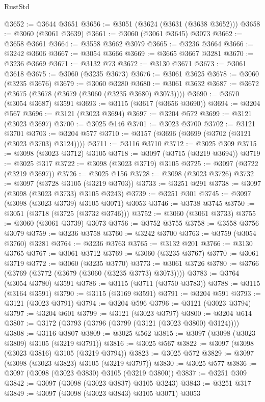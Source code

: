 \begin{lexlean}{RustStd}
\begin{coremodule}
{\begin{coremodule}
{{{{{{{{{{{{{{{{{{{{{{{{{{{{{{{{@3652 := @3644 @3651
@3656 := @3051 (@3624 (@3631 (@3638 @3652)))
@3658 := @3060 (@3061 @3639)
@3661 := @3060 (@3061 @3645) @3073
@3662 := @3658 @3661
@3664 := @3558 @3662 @3079
@3665 := @3236 @3664
@3666 := @3242 @3606
@3667 := @3054 @3666
@3669 := @3665 @3667 @3281
@3670 := @3236 @3669
@3671 := @3132 @73
@3672 := @3130 @3671
@3673 := @3061 @3618
@3675 := @3060 (@3235 @3673)
@3676 := @3061 @3625
@3678 := @3060 (@3235 @3676)
@3679 := @3060 @3280
@3680 := @3061 @3632
@3687 := @3672 (@3675 (@3678 (@3679 (@3060 (@3235 @3680) @3073))))
@3690 := @3670 (@3054 @3687) @3591
@3693 := @3115 (@3617 (@3656 @3690))
@3694 := @3204 @567
@3696 := @3121 (@3023 @3694)
@3697 := @3204 @572
@3699 := @3121 (@3023 @3697)
@3700 := @3025 @146
@3701 := @3023 @3700
@3702 := @3121 @3701
@3703 := @3204 @577
@3710 := @3157 (@3696 (@3699 (@3702 (@3121 (@3023 @3703) @3124))))
@3711 := @3116 @3710
@3712 := @3025 @309
@3715 := @3098 (@3023 @3712) @3105
@3718 := @3097 (@3715 (@3219 @3694))
@3719 := @3025 @317
@3722 := @3098 (@3023 @3719) @3105
@3725 := @3097 (@3722 (@3219 @3697))
@3726 := @3025 @156
@3728 := @3098 (@3023 @3726)
@3732 := @3097 (@3728 @3105 (@3219 @3703))
@3733 := @3251 @291
@3738 := @3097 (@3098 (@3023 @3733) @3105 @3243)
@3739 := @3251 @301
@3745 := @3097 (@3098 (@3023 @3739) @3105 @3071) @3053
@3746 := @3738 @3745
@3750 := @3051 (@3718 (@3725 (@3732 @3746)))
@3752 := @3060 (@3061 @3733)
@3755 := @3060 (@3061 @3739) @3073
@3756 := @3752 @3755
@3758 := @3558 @3756 @3079
@3759 := @3236 @3758
@3760 := @3242 @3700
@3763 := @3759 (@3054 @3760) @3281
@3764 := @3236 @3763
@3765 := @3132 @201
@3766 := @3130 @3765
@3767 := @3061 @3712
@3769 := @3060 (@3235 @3767)
@3770 := @3061 @3719
@3772 := @3060 (@3235 @3770)
@3773 := @3061 @3726
@3780 := @3766 (@3769 (@3772 (@3679 (@3060 (@3235 @3773) @3073))))
@3783 := @3764 (@3054 @3780) @3591
@3786 := @3115 (@3711 (@3750 @3783))
@3788 := @3115 (@3164 @3591)
@3790 := @3115 (@3169 @3591)
@3791 := @3204 @591
@3793 := @3121 (@3023 @3791)
@3794 := @3204 @596
@3796 := @3121 (@3023 @3794)
@3797 := @3204 @601
@3799 := @3121 (@3023 @3797)
@3800 := @3204 @614
@3807 := @3172 (@3793 (@3796 (@3799 (@3121 (@3023 @3800) @3124))))
@3808 := @3116 @3807
@3809 := @3025 @562
@3815 := @3097 (@3098 (@3023 @3809) @3105 (@3219 @3791))
@3816 := @3025 @567
@3822 := @3097 (@3098 (@3023 @3816) @3105 (@3219 @3794))
@3823 := @3025 @572
@3829 := @3097 (@3098 (@3023 @3823) @3105 (@3219 @3797))
@3830 := @3025 @577
@3836 := @3097 (@3098 (@3023 @3830) @3105 (@3219 @3800))
@3837 := @3251 @309
@3842 := @3097 (@3098 (@3023 @3837) @3105 @3243)
@3843 := @3251 @317
@3849 := @3097 (@3098 (@3023 @3843) @3105 @3071) @3053
}}}}}}}}}}}}}}}}}}}}}}}}}}}}}}}}
\end{coremodule}}
\end{coremodule}
\end{lexlean}
